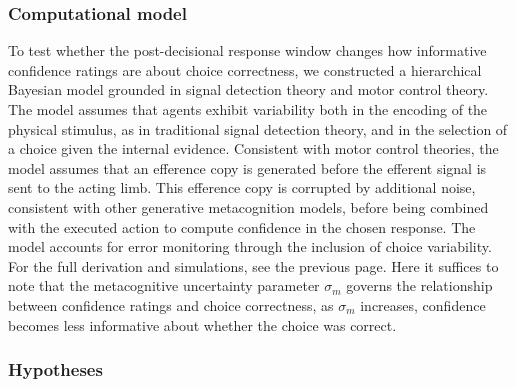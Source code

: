 \documentclass[
]{article}
\begin{document}
\subsubsection{Computational model}\label{computational-model}

To test whether the post-decisional response window changes how
informative confidence ratings are about choice correctness, we
constructed a hierarchical Bayesian model grounded in signal detection
theory and motor control theory. The model assumes that agents exhibit
variability both in the encoding of the physical stimulus, as in
traditional signal detection theory, and in the selection of a choice
given the internal evidence. Consistent with motor control theories, the
model assumes that an efference copy is generated before the efferent
signal is sent to the acting limb. This efference copy is corrupted by
additional noise, consistent with other generative metacognition models,
before being combined with the executed action to compute confidence in
the chosen response. The model accounts for error monitoring through the
inclusion of choice variability. For the full derivation and
simulations, see the previous page. Here it suffices to note that the
metacognitive uncertainty parameter \(\sigma_m\) governs the
relationship between confidence ratings and choice correctness, as
\(\sigma_m\) increases, confidence becomes less informative about
whether the choice was correct.

\subsubsection{Hypotheses}\label{hypotheses}
\end{document}

